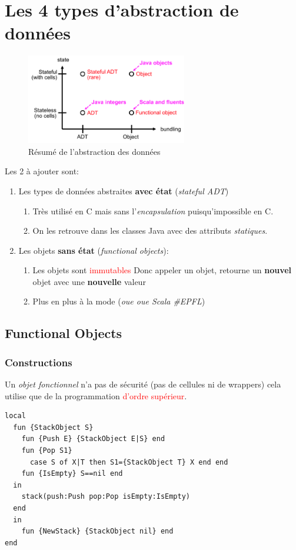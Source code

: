 \documentclass{report}
\begin{document}
\section{Les 4 types d'abstraction de données}
\begin{figure}
\centering
\includegraphics[width=7cm]{img/resAbstract.png}
\caption{Résumé de l'abstraction des données}
\end{figure}
Les 2 à ajouter sont:
\begin{enumerate}
\item Les types de données abstraites \textbf{avec état} (\textit{stateful ADT})
	\begin{enumerate}
	\item Très utilisé en C mais sans l'\textit{encapsulation} puisqu'impossible en C.
	\item On les retrouve dans les classes Java avec des attributs \textit{statiques}.
	\end{enumerate}
\item Les objets \textbf{sans état} (\textit{functional objects}):
	\begin{enumerate}
	\item Les objets sont \textcolor{red}{immutables} Donc appeler un objet, retourne un \textbf{nouvel} objet avec une \textbf{nouvelle} valeur
	\item Plus en plus à la mode (\textit{oue oue Scala \#EPFL})
	\end{enumerate}
\end{enumerate}

\subsection{Functional Objects}
\subsubsection{Constructions}
Un \textit{objet fonctionnel} n'a pas de sécurité (pas de cellules ni de wrappers) cela utilise que de la programmation \textcolor{red}{d'ordre supérieur}.
\begin{lstlisting}[escapechar=\%]
local 
  fun {StackObject S} 
    fun {Push E} {StackObject E|S} end 
    fun {Pop S1} 
      case S of X|T then S1={StackObject T} X end end 
    fun {IsEmpty} S==nil end
  in
    stack(push:Push pop:Pop isEmpty:IsEmpty) 
  end 
  in 
    fun {NewStack} {StackObject nil} end
end
\end{lstlisting}
\end{document}
